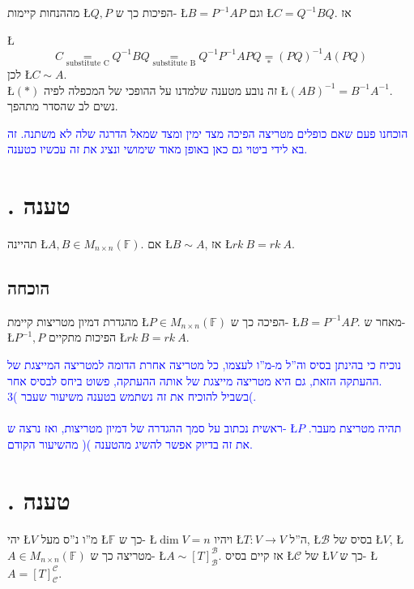 \documentclass[english,hebrew]{article}
\newcommand{\sqrmn}{M_{n\times n}(\mathbb{F})}
\begin{document}
מההנחות קיימות \L{$Q,P$} הפיכות כך ש- \L{$B=P^{-1}AP$} וגם \L{$C=Q^{-1}BQ$}.
אז 

\L{%
\[
C\underset{\text{substitute C}}{=}Q^{-1}BQ\underset{\text{substitute B}}{=}Q^{-1}P^{-1}APQ\underset{*}{=}(PQ)^{-1}A(PQ)
\]
}%
לכן \L{$C\sim A$}.\\

\L{$(*)$} זה נובע מטענה שלמדנו על ההופכי של המכפלה לפיה \L{$(AB)^{-1}=B^{-1}A^{-1}$}.
נשים לב שהסדר מתהפך.

\medskip{}

\textcolor{blue}{הוכחנו פעם שאם כופלים מטריצה הפיכה מצד ימין ומצד
שמאל הדרגה שלה לא משתנה. זה בא לידי ביטוי גם כאן באופן מאוד שימושי
ונציג את זה עכשיו כטענה.}

\section{{\endL}. טענה}

תהיינה \L{$A,B\in\sqrmn$}. אם \L{$B\sim A$}, אז \L{$rk\:B=rk\:A$}.

\subsection{הוכחה}

מהגדרת דמיון מטריצות קיימת \L{$P\in\sqrmn$} הפיכה כך ש- \L{$B=P^{-1}AP$}.
מאחר ש- \L{$P^{-1},P$} הפיכות מתקיים \L{$rk\:B=rk\:A$}.

\textcolor{blue}{נוכיח כי בהינתן בסיס וה\textquotedblright ל מ-מ\textquotedblright ו
לעצמו, כל מטריצה אחרת הדומה למטריצה המייצגת של ההעתקה הזאת, גם היא
מטריצה מייצגת של אותה ההעתקה, פשוט ביחס לבסיס אחר.}\\

\textcolor{blue}{בשביל להוכיח את זה נשתמש בטענה משיעור שעבר )3(.}\\
\textcolor{blue}{}\\
\textcolor{blue}{ראשית נכתוב על סמך ההגדרה של דמיון מטריצות, ואז נרצה
ש- \L{$P$} תהיה מטריצת מעבר. את זה בדיוק אפשר להשיג מהטענה )}\textcolor{blue}{{}\endL}\textcolor{blue}{(
מהשיעור הקודם. }

\section{{\endL}. טענה}

יהי \L{$V$} מ\textquotedblright ו נ\textquotedblright ס מעל \L{$\mathbb{F}$}
כך ש- \L{$\dim V=n$} ויהיו \L{$T:V\rightarrow V$} ה\textquotedblright ל,
\L{$\mathcal{B}$} בסיס של \L{$V$}, \L{$A\in\sqrmn$} מטריצה כך ש-
\L{$A\sim[T]_{\mathcal{B}}^{\mathcal{B}}$}. אז קיים בסיס \L{$\mathcal{C}$}
של \L{$V$} כך ש- \L{$A=[T]_{\mathcal{C}}^{\mathcal{C}}$}.
\end{document}

